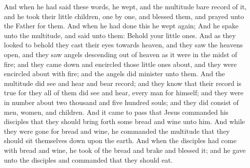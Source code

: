 And when he had said these words, he wept, and the multitude bare record of it, and he took their little children, one by one, and blessed them, and prayed unto the Father for them.
\bverse \iffalse And when he had done this he wept again; \fi
And when he had done this he wept again;
\bverse \iffalse And he spake unto the multitude, and said unto them: Behold your little ones. \fi
And he spake unto the multitude, and said unto them: Behold your little ones.
\bverse \iffalse And as they looked to behold they cast their eyes towards heaven, and they saw the heavens open, and they saw angels descending out of heaven as it were in the midst of fire; and they came down and encircled those little ones about, and they were encircled about with fire; and the angels did minister unto them. \fi
And as they looked to behold they cast their eyes towards heaven, and they saw the heavens open, and they saw angels descending out of heaven as it were in the midst of fire; and they came down and encircled those little ones about, and they were encircled about with fire; and the angels did minister unto them.
\bverse \iffalse And the multitude did see and hear and bear record; and they know that their record is true for they all of them did see and hear, every man for himself; and they were in number about two thousand and five hundred souls; and they did consist of men, women, and children. \fi
And the multitude did see and hear and bear record; and they know that their record is true for they all of them did see and hear, every man for himself; and they were in number about two thousand and five hundred souls; and they did consist of men, women, and children.
\bchapter
\bverse \iffalse And it came to pass that Jesus commanded his disciples that they should bring forth some bread and wine unto him. \fi
And it came to pass that Jesus commanded his disciples that they should bring forth some bread and wine unto him.
\bverse \iffalse And while they were gone for bread and wine, he commanded the multitude that they should sit themselves down upon the earth. \fi
And while they were gone for bread and wine, he commanded the multitude that they should sit themselves down upon the earth.
\bverse \iffalse And when the disciples had come with bread and wine, he took of the bread and brake and blessed it; and he gave unto the disciples and commanded that they should eat. \fi
And when the disciples had come with bread and wine, he took of the bread and brake and blessed it; and he gave unto the disciples and commanded that they should eat.
